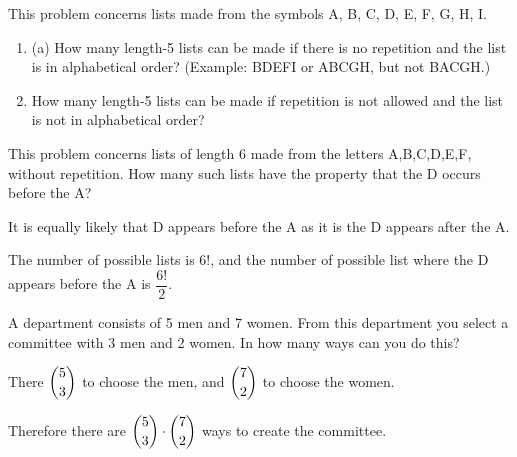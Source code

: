 \documentclass[openany, 11pt]{book}
\begin{document}
\begin{exercise}{}{}
	This problem concerns lists made from the symbols A, B, C, D, E, F, G, H, I.

	\begin{enumerate}[label = {(\arabic*)}]
		\item (a) How many length-5 lists can be made if there is no repetition
		      and the list is in alphabetical order? (Example: BDEFI or ABCGH, but
		      not BACGH.)
		\item How many length-5 lists can be made if repetition is not allowed and
		      the list is not in alphabetical order?
	\end{enumerate}
\end{exercise}

\begin{exercise}{}{}
	This problem concerns lists of length 6 made from the
	letters A,B,C,D,E,F, without repetition. How many such lists have the
	property that the D occurs before the A?
	\begin{alist}
		\item It is equally likely that D appears before the A as it is the D appears
		after the A.
		\item The number of possible lists is $6!$, and the number of possible list
		where the D appears before the A is $\dfrac{6!}{2}$.
	\end{alist}
\end{exercise}

\begin{exercise}{}{}
	A department consists of 5 men and 7 women. From this
	department you select a committee with 3 men and 2 women. In how many ways
	can you do this?
	\begin{alist}
		\item There $\dbinom{5}{3}$ to choose the men, and $\dbinom{7}{2}$ to choose the
		women.
		\item Therefore there are $\dbinom{5}{3}\cdot \dbinom{7}{2}$ ways to create the
		committee.
	\end{alist}
\end{exercise}
\end{document}
